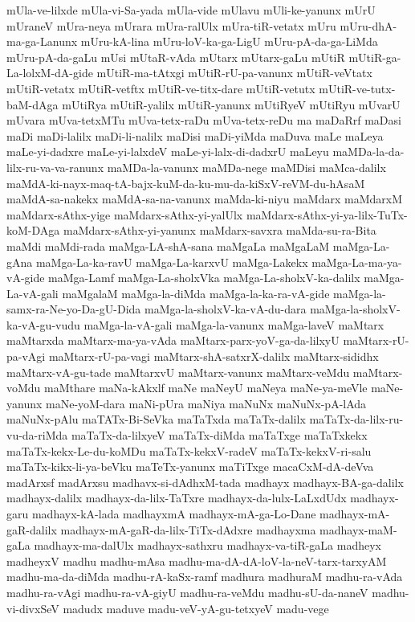 {mUla-ve-lilxde
mUla-vi-Sa-yada
mUla-vide
mUlavu
mUli-ke-yanunx
mUrU
mUraneV
mUra-neya
mUrara
mUra-ralUlx
mUra-tiR-vetatx
mUru
mUru-dhA-ma-ga-Lanunx
mUru-kA-lina
mUru-loV-ka-ga-LigU
mUru-pA-da-ga-LiMda
mUru-pA-da-gaLu
mUsi
mUtaR-vAda
mUtarx
mUtarx-gaLu
mUtiR
mUtiR-ga-La-lolxM-dA-gide
mUtiR-ma-tAtxgi
mUtiR-rU-pa-vanunx
mUtiR-veVtatx
mUtiR-vetatx
mUtiR-vetftx
mUtiR-ve-titx-dare
mUtiR-vetutx
mUtiR-ve-tutx-baM-dAga
mUtiRya
mUtiR-yalilx
mUtiR-yanunx
mUtiRyeV
mUtiRyu
mUvarU
mUvara
mUva-tetxMTu
mUva-tetx-raDu
mUva-tetx-reDu
ma
maDaRrf
maDasi
maDi
maDi-lalilx
maDi-li-nalilx
maDisi
maDi-yiMda
maDuva
maLe
maLeya
maLe-yi-dadxre
maLe-yi-lalxdeV
maLe-yi-lalx-di-dadxrU
maLeyu
maMDa-la-da-lilx-ru-va-va-ranunx
maMDa-la-vanunx
maMDa-nege
maMDisi
maMca-dalilx
maMdA-ki-nayx-maq-tA-bajx-kuM-da-ku-mu-da-kiSxV-reVM-du-hAsaM
maMdA-sa-nakekx
maMdA-sa-na-vanunx
maMda-ki-niyu
maMdarx
maMdarxM
maMdarx-sAthx-yige
maMdarx-sAthx-yi-yalUlx
maMdarx-sAthx-yi-ya-lilx-TuTx-koM-DAga
maMdarx-sAthx-yi-yanunx
maMdarx-savxra
maMda-su-ra-Bita
maMdi
maMdi-rada
maMga-LA-shA-sana
maMgaLa
maMgaLaM
maMga-La-gAna
maMga-La-ka-ravU
maMga-La-karxvU
maMga-Lakekx
maMga-La-ma-ya-vA-gide
maMga-Lamf
maMga-La-sholxVka
maMga-La-sholxV-ka-dalilx
maMga-La-vA-gali
maMgalaM
maMga-la-diMda
maMga-la-ka-ra-vA-gide
maMga-la-samx-ra-Ne-yo-Da-gU-Dida
maMga-la-sholxV-ka-vA-du-dara
maMga-la-sholxV-ka-vA-gu-vudu
maMga-la-vA-gali
maMga-la-vanunx
maMga-laveV
maMtarx
maMtarxda
maMtarx-ma-ya-vAda
maMtarx-parx-yoV-ga-da-lilxyU
maMtarx-rU-pa-vAgi
maMtarx-rU-pa-vagi
maMtarx-shA-satxrX-dalilx
maMtarx-sididhx
maMtarx-vA-gu-tade
maMtarxvU
maMtarx-vanunx
maMtarx-veMdu
maMtarx-voMdu
maMthare
maNa-kAkxlf
maNe
maNeyU
maNeya
maNe-ya-meVle
maNe-yanunx
maNe-yoM-dara
maNi-pUra
maNiya
maNuNx
maNuNx-pA-lAda
maNuNx-pAlu
maTATx-Bi-SeVka
maTaTxda
maTaTx-dalilx
maTaTx-da-lilx-ru-vu-da-riMda
maTaTx-da-lilxyeV
maTaTx-diMda
maTaTxge
maTaTxkekx
maTaTx-kekx-Le-du-koMDu
maTaTx-kekxV-radeV
maTaTx-kekxV-ri-salu
maTaTx-kikx-li-ya-beVku
maTeTx-yanunx
maTiTxge
macaCxM-dA-deVva
madArxsf
madArxsu
madhavx-si-dAdhxM-tada
madhayx
madhayx-BA-ga-dalilx
madhayx-dalilx
madhayx-da-lilx-TaTxre
madhayx-da-lulx-LaLxdUdx
madhayx-garu
madhayx-kA-lada
madhayxmA
madhayx-mA-ga-Lo-Dane
madhayx-mA-gaR-dalilx
madhayx-mA-gaR-da-lilx-TiTx-dAdxre
madhayxma
madhayx-maM-gaLa
madhayx-ma-dalUlx
madhayx-sathxru
madhayx-va-tiR-gaLa
madheyx
madheyxV
madhu
madhu-mAsa
madhu-ma-dA-dA-loV-la-neV-tarx-tarxyAM
madhu-ma-da-diMda
madhu-rA-kaSx-ramf
madhura
madhuraM
madhu-ra-vAda
madhu-ra-vAgi
madhu-ra-vA-giyU
madhu-ra-veMdu
madhu-sU-da-naneV
madhu-vi-divxSeV
madudx
maduve
madu-veV-yA-gu-tetxyeV
madu-vege
}
